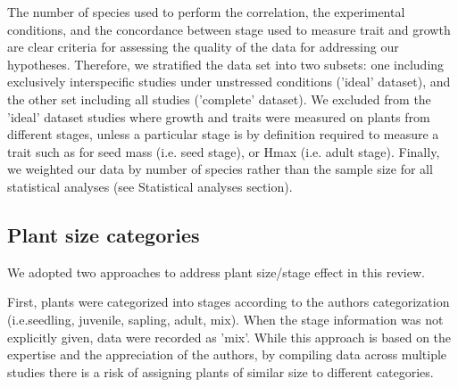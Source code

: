 \documentclass[a4paper]{article}\usepackage[]{graphicx}\usepackage[]{color}
\begin{document}
The number of species used to perform the correlation, the experimental conditions, and the concordance between stage used to measure trait and growth are clear criteria for assessing the quality of the data for addressing our hypotheses. Therefore, we stratified the data set into two subsets: one including exclusively interspecific studies under unstressed conditions ('ideal' dataset), and the other set including all studies ('complete' dataset). We excluded from the 'ideal' dataset studies where growth and traits were measured on plants from different stages, unless a particular stage is by definition required to measure a trait such as for seed mass (i.e. seed stage), or Hmax (i.e. adult stage). Finally, we weighted our data by number of species rather than the sample size for all statistical analyses (see Statistical analyses section).


\subsection*{Plant size categories}\label{plant-size-categories}

We adopted two approaches to address plant size/stage effect in this review.

First, plants were categorized into stages according to the authors categorization (i.e.seedling, juvenile, sapling, adult, mix). When the stage information was not explicitly given, data were recorded as 'mix'. While this approach is based on the expertise and the appreciation of the authors, by compiling data across multiple studies there is a risk of assigning plants of similar size to different categories. 
\end{document}
